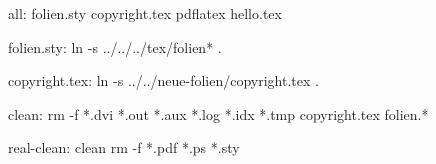 all: folien.sty copyright.tex
	pdflatex hello.tex

folien.sty:
	ln -s ../../../tex/folien* .

copyright.tex:
	ln -s ../../neue-folien/copyright.tex .

clean:
	rm -f *.dvi *.out *.aux *.log *.idx *.tmp copyright.tex folien.*

real-clean: clean
	rm -f *.pdf *.ps *.sty
